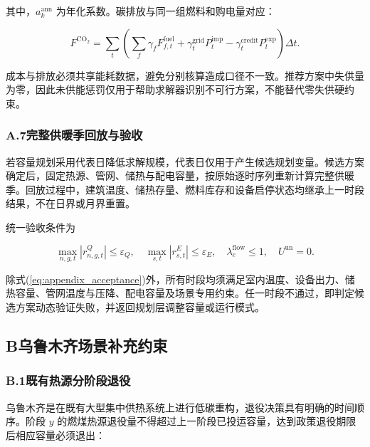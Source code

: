 其中，$a_k^{\mathrm{ann}}$ 为年化系数。碳排放与同一组燃料和购电量对应：

\begin{equation}
F^{\mathrm{CO_2}}
=\sum_t\left(\sum_f\gamma_fF_{f,t}^{\mathrm{fuel}}+\gamma_t^{\mathrm{grid}}P_t^{\mathrm{imp}}
-\gamma_t^{\mathrm{credit}}P_t^{\mathrm{exp}}\right)\Delta t.
\label{eq:carbon_detail}
\end{equation}

成本与排放必须共享能耗数据，避免分别核算造成口径不一致。推荐方案中失供量为零，因此未供能惩罚仅用于帮助求解器识别不可行方案，不能替代零失供硬约束。

\subsubsection*{A.7\quad 完整供暖季回放与验收}

若容量规划采用代表日降低求解规模，代表日仅用于产生候选规划变量。候选方案确定后，固定热源、管网、储热与配电容量，按原始逐时序列重新计算完整供暖季。回放过程中，建筑温度、储热存量、燃料库存和设备启停状态均继承上一时段结果，不在日界或月界重置。

统一验收条件为

\begin{equation}
\max_{n,g,t}|r_{n,g,t}^{Q}|\leq\varepsilon_Q,
\quad
\max_{s,t}|r_{s,t}^{E}|\leq\varepsilon_E,
\quad
\lambda_e^{\mathrm{flow}}\leq1,
\quad
U^{\mathrm{un}}=0.
\label{eq:appendix_acceptance}
\end{equation}

除式(\ref{eq:appendix_acceptance})外，所有时段均须满足室内温度、设备出力、储热容量、管网温度与压降、配电容量及场景专用约束。任一时段不通过，即判定候选方案动态验证失败，并返回规划层调整容量或运行模式。

\clearpage

\subsection*{B\quad 乌鲁木齐场景补充约束}
\label{app:urumqi}

\subsubsection*{B.1\quad 既有热源分阶段退役}

乌鲁木齐是在既有大型集中供热系统上进行低碳重构，退役决策具有明确的时间顺序。阶段 $y$ 的燃煤热源退役量不得超过上一阶段已投运容量，达到政策退役期限后相应容量必须退出：


